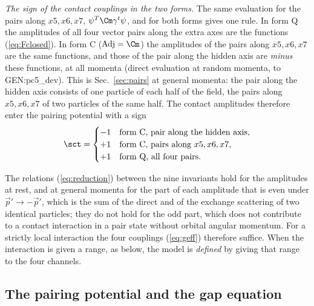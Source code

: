 \emph{The sign of the contact couplings in the two forms.} The same evaluation for the pairs along
$x5,x6,x7$, $\psi^{T}\Cm\gamma^{t}\psi$, and for both forms gives one rule. In form Q the amplitudes of
all four vector pairs along the extra axes are the functions (\ref{eq:Fclosed}). In form C
($\mathrm{Adj}=\Cm$) the amplitudes of the pairs along $x5,x6,x7$ are the same functions, and those of
the pair along the hidden axis are \emph{minus} these functions, at all momenta (direct evaluation
at random momenta, to {{GEN:pc5_dev}}). This is Sec.~\ref{sec:pairs} at general momenta: the pair
along the hidden axis consists of one particle of each half of the field, the pairs along $x5,x6,x7$
of two particles of the same half. The contact amplitudes therefore enter the pairing potential with
a sign
\begin{equation}
\sct=\begin{cases}-1&\text{form C, pair along the hidden axis},\\+1&\text{form C, pairs along }x5,x6,x7,\\+1&\text{form Q, all four pairs}.\end{cases}
\label{eq:sct}
\end{equation}

The relations (\ref{eq:reduction}) between the nine invariants hold for the amplitudes at rest, and at
general momenta for the part of each amplitude that is even under $\vec p'\to-\vec p'$, which is the
sum of the direct and of the exchange scattering of two identical particles; they do not hold for
the odd part, which does not contribute to a contact interaction in a pair state without orbital
angular momentum. For a strictly local interaction the four couplings (\ref{eq:geff}) therefore
suffice. When the interaction is given a range, as below, the model is \emph{defined} by giving that
range to the four channels.

\subsection{The pairing potential and the gap equation}

